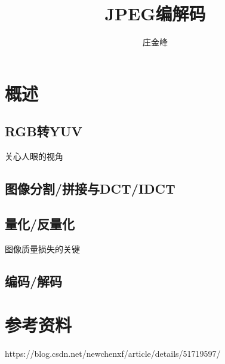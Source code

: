 \documentclass{article}
\title{JPEG编解码}
\author{庄金峰}
\begin{document}
\maketitle

\section{概述}

\subsection{RGB转YUV}

关心人眼的视角

\subsection{图像分割/拼接与DCT/IDCT}

\subsection{量化/反量化}

图像质量损失的关键

\subsection{编码/解码}

\section{参考资料}

https://blog.csdn.net/newchenxf/article/details/51719597/
\end{document}
